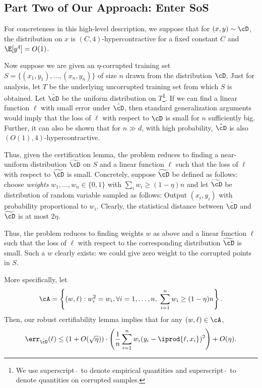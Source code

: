 
\subsection{Part Two of Our Approach: Enter SoS}
For concreteness in this high-level description, we suppose that for $(x,y) \sim \cD$, the distribution on $x$ is $(C,4)$-hypercontractive for a fixed constant $C$ and $\E[y^4] = O(1)$. 

Now suppose we are given an $\eta$-corrupted training set $S = \{(x_1,y_1),\ldots,(x_n, y_n)\}$ of size $n$ drawn from the distribution $\cD$. Just for analysis, let $T$ be the underlying uncorrupted training set from which $S$ is obtained. Let $\hat{\cD}$ be the uniform distribution on $T$\footnote{We use superscript $\hat{\;}$ to denote empirical quantities and superscript $\tilde{\;}$ to denote quantities on corrupted samples.}. If we can find a linear function $\ell$ with small error under $\hat{\cD}$, then standard generalization arguments would imply that the loss of $\ell$ with respect to $\cD$ is small for $n$ sufficiently big. Further, it can also be shown that for $n \gg d$, with high probability, $\hat{\cD}$ is also $(O(1), 4)$-hypercontractive. 

Thus, given the certification lemma, the problem reduces to finding a near-uniform distribution $\widetilde{\cD}$ on $S$ and a linear function $\ell$ such that the loss of $\ell$ with respect to $\widetilde{\cD}$ is small. Concretely, suppose $\widetilde{\cD}$ be defined as follows: choose \emph{weights} $w_1,\ldots,w_n \in \{0,1\}$ with $\sum_i w_i \geq (1-\eta) n$ and let $\widetilde{\cD}$ be distribution of random variable sampled as follows: Output $(x_i,y_i)$ with probability proportional to $w_i$. Clearly, the statistical distance between $\hat{\cD}$ and $\widetilde{\cD}$ is at most $2 \eta$. 

Thus, the problem reduces to finding weights $w$ as above and a linear function $\ell$ such that the loss of $\ell$ with respect to the corresponding distribution $\widetilde{\cD}$ is small. Such a $w$ clearly exists: we could give zero weight to the corrupted points in $S$. 

More specifically, let 
$$\cA = \left\{ (w,\ell) : w_i^2 = w_i, \forall i =1,\ldots,n, \; \sum_{i=1}^n w_i \geq (1-\eta) n\right\}.$$
Then, our robust certifiability lemma implies that for any $(w,\ell) \in \cA$, 
\begin{equation}\label{eq:intro1}
\err_{\hat{\cD}}(\ell) \leq (1 + O(\sqrt{\eta})) \cdot \left(\frac{1}{n}\sum_{i=1}^n w_i (y_i - \iprod{\ell,x_i})^2\right) + O(\eta) .
\end{equation}

